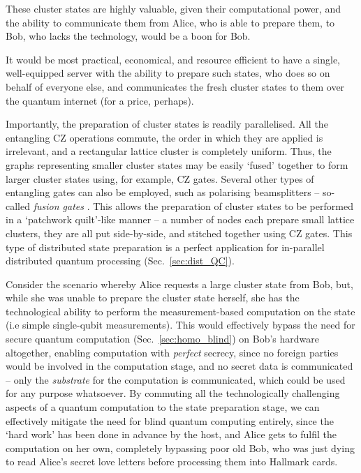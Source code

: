 \documentclass[aps, rmp, twocolumn, amsmath, amssymb, nofootinbib, superscriptaddress, longbibliography, floatfix, table-of-contents, eqsecnum]{revtex4-1}
\begin{document}
These cluster states are highly valuable, given their computational power, and the ability to communicate them from Alice, who is able to prepare them, to Bob, who lacks the technology, would be a boon for Bob.

It would be most practical, economical, and resource efficient to have a single, well-equipped server with the ability to prepare such states, who does so on behalf of everyone else, and communicates the fresh cluster states to them over the quantum internet (for a price, perhaps).

Importantly, the preparation of cluster states is readily parallelised. All the entangling CZ operations commute, the order in which they are applied is irrelevant, and a rectangular lattice cluster is completely uniform. Thus, the graphs representing smaller cluster states may be easily `fused' together to form larger cluster states using, for example, CZ gates. Several other types of entangling gates can also be employed, such as polarising beamsplitters -- so-called \textit{fusion gates} \cite{bib:BrowneRudolph05}. This allows the preparation of cluster states to be performed in a `patchwork quilt'-like manner -- a number of nodes each prepare small lattice clusters, they are all put side-by-side, and stitched together using CZ gates. This type of distributed state preparation is a perfect application for in-parallel distributed quantum processing (Sec.~\ref{sec:dist_QC}).

Consider the scenario whereby Alice requests a large cluster state from Bob, but, while she was unable to prepare the cluster state herself, she has the technological ability to perform the measurement-based computation on the state (i.e simple single-qubit measurements). This would effectively bypass the need for secure quantum computation (Sec.~\ref{sec:homo_blind}) on Bob's hardware altogether, enabling computation with \textit{perfect} secrecy, since no foreign parties would be involved in the computation stage, and no secret data is communicated -- only the \textit{substrate} for the computation is communicated, which could be used for any purpose whatsoever. By commuting all the technologically challenging aspects of a quantum computation to the state preparation stage, we can effectively mitigate the need for blind quantum computing entirely, since the `hard work' has been done in advance by the host, and Alice gets to fulfil the computation on her own, completely bypassing poor old Bob, who was just dying to read Alice's secret love letters before processing them into Hallmark cards.
\end{document}
